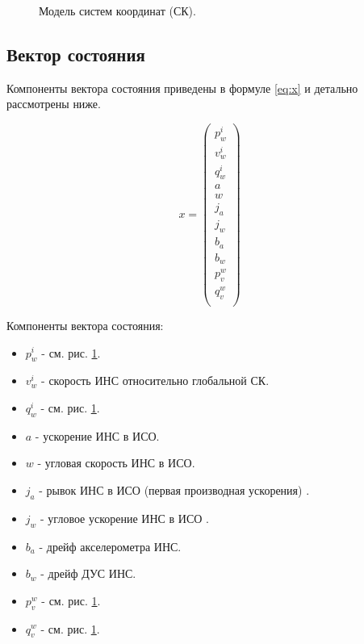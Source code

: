 \documentclass[11pt,a4paper]{article}
\begin{document}
\begin{figure}[!h]
    \centering
    
    \caption{\label{fig:frames}Модель систем координат (СК).}
\end{figure}

\subsection{Вектор состояния}

Компоненты вектора состояния приведены в формуле \ref{eq:x} и детально рассмотрены ниже.

\begin{equation}
    \label{eq:x}
    x=\left(
    \begin{array}{c}
    p_w^i \\
    v_w^i \\
    q_w^i \\
    a \\
    w \\
    j_a \\
    j_w \\
    b_a \\
    b_w \\
    p_v^w \\
    q_v^w \\
    \end{array}
    \right)
\end{equation}

Компоненты вектора состояния:
\begin{itemize}
    \item $p_w^i$ - см. рис. \ref{fig:frames}.
    \item $v_w^i$ - скорость ИНС относительно глобальной СК.
    \item $q_w^i$ - см. рис. \ref{fig:frames}.
    \item $a$ - ускорение ИНС в ИСО.
    \item $w$ - угловая скорость ИНС в ИСО.
    \item $j_a$ - рывок ИНС в ИСО (первая производная ускорения) \cite{Kishore94}.
    \item $j_w$ - угловое ускорение ИНС в ИСО \cite{Kishore94}.
    \item $b_a$ - дрейф акселерометра ИНС.
    \item $b_w$ - дрейф ДУС ИНС.
    \item $p_v^w$ - см. рис. \ref{fig:frames}.
    \item $q_v^w$ - см. рис. \ref{fig:frames}.
\end{itemize}
\end{document}
